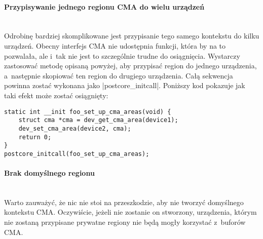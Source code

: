 \paragraph{Przypisywanie jednego regionu CMA do wielu urządzeń} \hspace{0pt} \\

Odrobinę bardziej skomplikowane jest przypisanie tego samego kontekstu
do kilku urządzeń.  Obecny interfejs CMA nie udostępnia funkcji, która
by na to pozwalała, ale i~tak nie jest to szczególnie trudne do
osiągnięcia.  Wystarczy zastosować metodę opisaną powyżej, aby
przypisać region do jednego urządzenia, a~następnie skopiować ten
region do drugiego urządzenia.  Całą sekwencja powinna zostać wykonana
jako \code|postcore_initcall|.  Poniższy kod pokazuje jak taki
efekt może zostać osiągnięty:

\begin{lstlisting}
static int __init foo_set_up_cma_areas(void) {
	struct cma *cma = dev_get_cma_area(device1);
	dev_set_cma_area(device2, cma);
	return 0;
}
postcore_initcall(foo_set_up_cma_areas);
\end{lstlisting}

\paragraph{Brak domyślnego regionu} \hspace{0pt} \\

Warto zauważyć, że nic nie stoi na przeszkodzie, aby nie tworzyć
domyślnego kontekstu CMA.  Oczywiście, jeżeli nie zostanie on
stworzony, urządzenia, którym nie zostaną przypisane prywatne regiony
nie będą mogły korzystać z~buforów CMA.
